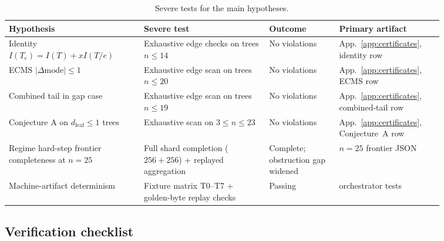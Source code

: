 \documentclass[12pt,oneside]{article}
\theoremstyle{remark}
\newcommand{\dleaf}{d_{\mathrm{leaf}}}    %
\begin{document}
\begin{table}[!htbp]
  \centering
  \caption{Severe tests for the main hypotheses.}
  \label{tab:falsification}
  \small
  \begin{tabular}{@{}p{0.27\linewidth} p{0.25\linewidth} p{0.14\linewidth} p{0.20\linewidth}@{}}
    \toprule
    Hypothesis & Severe test & Outcome & Primary artifact \\
    \midrule
    Identity $I(T_e)=I(T)+xI(T/e)$ & Exhaustive edge checks on trees $n \le 14$ & No violations & App.~\ref{app:certificates}, identity row \\
    ECMS $|\Delta \mathrm{mode}| \le 1$ & Exhaustive edge scan on trees $n \le 20$ & No violations & App.~\ref{app:certificates}, ECMS row \\
    Combined tail in gap case & Exhaustive edge scan on trees $n \le 19$ & No violations & App.~\ref{app:certificates}, combined-tail row \\
    Conjecture A on $\dleaf \le 1$ trees & Exhaustive scan on $3\le n\le23$ & No violations & App.~\ref{app:certificates}, Conjecture~A row \\
    Regime hard-step frontier completeness at $n=25$ & Full shard completion ($256+256$) + replayed aggregation & Complete; obstruction gap widened & $n=25$ frontier JSON \\
    Machine-artifact determinism & Fixture matrix T0--T7 + golden-byte replay checks & Passing & orchestrator tests \\
    \bottomrule
  \end{tabular}
\end{table}


\subsection{Verification checklist}\label{app:verify}
\end{document}

